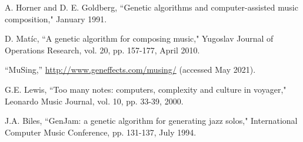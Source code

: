 \documentclass[conference]{IEEEtran}
\begin{document}
\begin{thebibliography}{00}
     A. Horner and D. E. Goldberg, ``Genetic algorithms and
    computer-assisted music composition," January 1991.

     D. Matíc, ``A genetic algorithm for composing music,"
    Yugoslav Journal of Operations Research, vol. 20, pp. 157-177, April 2010.

     ``MuSing,'' \url{http://www.geneffects.com/musing/} (accessed
    May 2021).

     G.E. Lewis, ``Too many notes: computers, complexity and
    culture in voyager," Leonardo Music Journal, vol. 10, pp. 33-39, 2000.

     J.A. Biles, ``GenJam: a genetic algorithm for generating
    jazz solos," International Computer Music Conference, pp. 131-137, July 1994.

\end{thebibliography}
\end{document}
